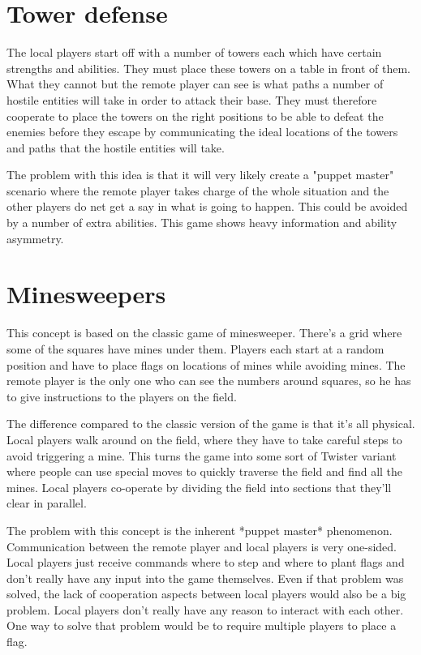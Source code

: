 \section{Tower defense}
	The local players start off with a number of towers each
	which have certain strengths and abilities. They must place
	these towers on a table in front of them. What they cannot
	but the remote player can see is what paths a number of
	hostile entities will take in order to attack their base.
	They must therefore cooperate to place the towers on the right
	positions to be able to defeat the enemies before they escape
	by communicating the ideal locations of the
	towers and paths that the hostile entities will take.

	The problem with this idea is that it will very likely create a
	"puppet master" scenario where the remote player takes charge
	of the whole situation and the other players do net get a
	say in what is going to happen. This could be avoided by a
	number of extra abilities. This game shows heavy
	information and ability asymmetry.

\section{Minesweepers}
	This concept is based on the classic game of minesweeper. There's a grid
	where some of the squares have mines under them. Players each start at a
	random position and have to place flags on locations of mines while avoiding
	mines. The remote player is the only one who can see the numbers around
	squares, so he has to give instructions to the players on the field.

	The difference compared to the classic version of the game is that it's all
	physical. Local players walk around on the field, where they have to take
	careful steps to avoid triggering a mine. This turns the game into some sort
	of Twister variant where people can use special moves to quickly traverse
	the field and find all the mines. Local players co-operate by dividing the
	field into sections that they'll clear in parallel.

	The problem with this concept is the inherent *puppet master* phenomenon.
	Communication between the remote player and local players is very one-sided.
	Local players just receive commands where to step and where to plant flags
	and don't really have any input into the game themselves. Even if that
	problem was solved, the lack of cooperation aspects between local players
	would also be a big problem. Local players don't really have any reason to
	interact with each other. One way to solve that problem would be to require
	multiple players to place a flag.

